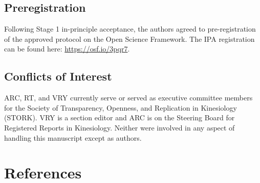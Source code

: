\documentclass[]{cik}%
\begin{document}
\hypertarget{preregistration}{%
\subsection{Preregistration}\label{preregistration}}

Following Stage 1 in-principle acceptance, the authors agreed to
pre-registration of the approved protocol on the Open Science Framework.
The IPA registration can be found here: \url{https://osf.io/3pqr7}.

\hypertarget{conflicts-of-interest}{%
\subsection{Conflicts of Interest}\label{conflicts-of-interest}}

ARC, RT, and VRY currently serve or served as executive committee
members for the Society of Transparency, Openness, and Replication in
Kinesiology (STORK). VRY is a section editor and ARC is on the Steering
Board for Registered Reports in Kinesiology. Neither were involved in
any aspect of handling this manuscript except as authors.

\newpage

\hypertarget{references}{%
\section{References}\label{references}}

\parindent0pt 
\setlength{\parskip}{1em}
\end{document}
